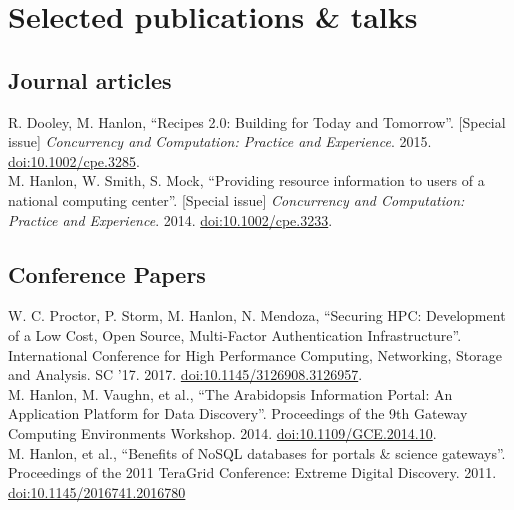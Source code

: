 \documentclass[10pt, a4paper]{article}
\newcommand{\years}[1]{\marginnote{\scriptsize #1}}
\begin{document}
\section*{Selected publications \& talks}

\subsection*{Journal articles}
\noindent
\years{2015}R. Dooley, M. Hanlon, ``Recipes 2.0: Building for Today and Tomorrow''. [Special issue] \emph{Concurrency and Computation: Practice and Experience}. 2015. \href{http://dx.doi.org/10.1002/cpe.3285}{doi:10.1002/cpe.3285}.\\
\years{2014}M. Hanlon, W. Smith, S. Mock, ``Providing resource information to users of a national computing center''. [Special issue] \emph{Concurrency and Computation: Practice and Experience}. 2014. \href{http://dx.doi.org/10.1002/cpe.3233}{doi:10.1002/cpe.3233}.

\subsection*{Conference Papers}
\noindent
\years{2017}W. C. Proctor, P. Storm, M. Hanlon, N. Mendoza, ``Securing HPC: Development of a Low Cost, Open Source, Multi-Factor Authentication Infrastructure''. International Conference for High Performance Computing, Networking, Storage and Analysis. SC '17. 2017. \href{https://doi.org/10.1145/3126908.3126957}{doi:10.1145/3126908.3126957}.\\
\years{2014}M. Hanlon, M. Vaughn, et al., ``The Arabidopsis Information Portal: An Application Platform for Data Discovery''. Proceedings of the 9th Gateway Computing Environments Workshop. 2014. \href{http://dx.doi.org/10.1109/GCE.2014.10}{doi:10.1109/GCE.2014.10}.\\
\years{2011}M. Hanlon, et al., ``Benefits of NoSQL databases for portals \& science gateways''. Proceedings of the 2011 TeraGrid Conference: Extreme Digital Discovery. 2011. \href{http://dx.doi.org/10.1145/2016741.2016780}{doi:10.1145/2016741.2016780}\\
\end{document}
